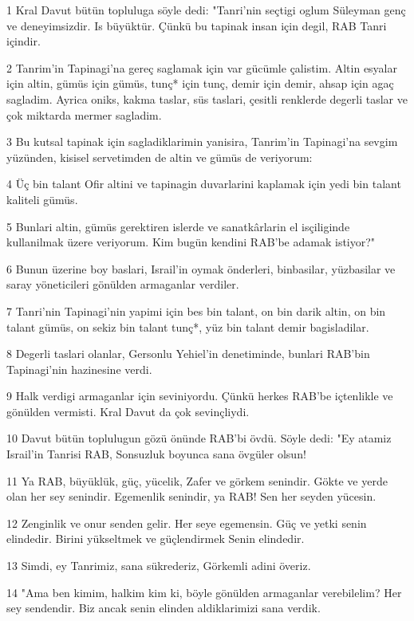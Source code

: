\par 1 Kral Davut bütün topluluga söyle dedi: "Tanri'nin seçtigi oglum Süleyman genç ve deneyimsizdir. Is büyüktür. Çünkü bu tapinak insan için degil, RAB Tanri içindir.
\par 2 Tanrim'in Tapinagi'na gereç saglamak için var gücümle çalistim. Altin esyalar için altin, gümüs için gümüs, tunç* için tunç, demir için demir, ahsap için agaç sagladim. Ayrica oniks, kakma taslar, süs taslari, çesitli renklerde degerli taslar ve çok miktarda mermer sagladim.
\par 3 Bu kutsal tapinak için sagladiklarimin yanisira, Tanrim'in Tapinagi'na sevgim yüzünden, kisisel servetimden de altin ve gümüs de veriyorum:
\par 4 Üç bin talant Ofir altini ve tapinagin duvarlarini kaplamak için yedi bin talant kaliteli gümüs.
\par 5 Bunlari altin, gümüs gerektiren islerde ve sanatkârlarin el isçiliginde kullanilmak üzere veriyorum. Kim bugün kendini RAB'be adamak istiyor?"
\par 6 Bunun üzerine boy baslari, Israil'in oymak önderleri, binbasilar, yüzbasilar ve saray yöneticileri gönülden armaganlar verdiler.
\par 7 Tanri'nin Tapinagi'nin yapimi için bes bin talant, on bin darik altin, on bin talant gümüs, on sekiz bin talant tunç*, yüz bin talant demir bagisladilar.
\par 8 Degerli taslari olanlar, Gersonlu Yehiel'in denetiminde, bunlari RAB'bin Tapinagi'nin hazinesine verdi.
\par 9 Halk verdigi armaganlar için seviniyordu. Çünkü herkes RAB'be içtenlikle ve gönülden vermisti. Kral Davut da çok sevinçliydi.
\par 10 Davut bütün toplulugun gözü önünde RAB'bi övdü. Söyle dedi: "Ey atamiz Israil'in Tanrisi RAB, Sonsuzluk boyunca sana övgüler olsun!
\par 11 Ya RAB, büyüklük, güç, yücelik, Zafer ve görkem senindir. Gökte ve yerde olan her sey senindir. Egemenlik senindir, ya RAB! Sen her seyden yücesin.
\par 12 Zenginlik ve onur senden gelir. Her seye egemensin. Güç ve yetki senin elindedir. Birini yükseltmek ve güçlendirmek Senin elindedir.
\par 13 Simdi, ey Tanrimiz, sana sükrederiz, Görkemli adini överiz.
\par 14 "Ama ben kimim, halkim kim ki, böyle gönülden armaganlar verebilelim? Her sey sendendir. Biz ancak senin elinden aldiklarimizi sana verdik.
